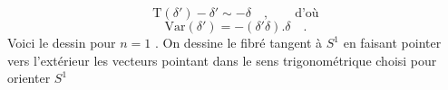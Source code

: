 \begin{equation*}
\mathrm{T}(\delta') - \delta' \sim -\delta \quad , \qquad \mbox{d'o\`u}
\end{equation*}
\begin{equation*}
\mathrm{Var}(\delta') = -(\delta' \delta) . \delta \quad .
\end{equation*}
Voici le dessin pour $n = 1$ . On dessine le fibré tangent à $S^1$ en faisant pointer vers l'extérieur les vecteurs pointant dans le sens trigonométrique choisi pour orienter $S^1$



\begin{center}
\end{center}
